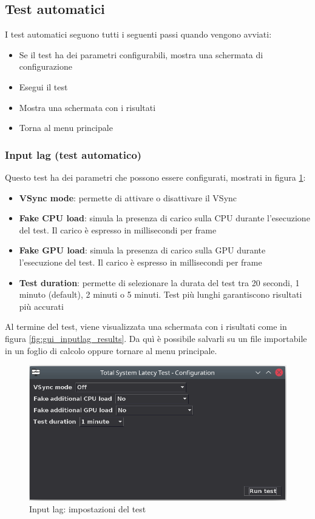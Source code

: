\subsection{Test automatici}
I test automatici seguono tutti i seguenti passi quando vengono avviati:\begin{itemize}
	\item Se il test ha dei parametri configurabili, mostra una schermata di configurazione
	\item Esegui il test
	\item Mostra una schermata con i risultati
	\item Torna al menu principale
\end{itemize}

\subsubsection{Input lag (test automatico)}
Questo test ha dei parametri che possono essere configurati, mostrati in figura \ref{fig:gui_inputlag_settings}:\begin{itemize}
	\item \textbf{VSync mode}: permette di attivare o disattivare il VSync
	\item \textbf{Fake CPU load}: simula la presenza di carico sulla CPU durante l'esecuzione del test. Il carico è espresso in millisecondi per frame
	\item \textbf{Fake GPU load}: simula la presenza di carico sulla GPU durante l'esecuzione del test. Il carico è espresso in millisecondi per frame
	\item \textbf{Test duration}: permette di selezionare la durata del test tra 20 secondi, 1 minuto (default), 2 minuti o 5 minuti. Test più lunghi garantiscono risultati più accurati
\end{itemize}

Al termine del test, viene visualizzata una schermata con i risultati come in figura \ref{fig:gui_inputlag_results}. Da quì è possibile salvarli su un file importabile in un foglio di calcolo oppure tornare al menu principale.

\begin{figure}[H]
	\centering
	\includegraphics[width=.8\textwidth]{Applicazione_files/gui_inputlag_settings.png}
	\caption{Input lag: impostazioni del test}
	\label{fig:gui_inputlag_settings}
\end{figure}

